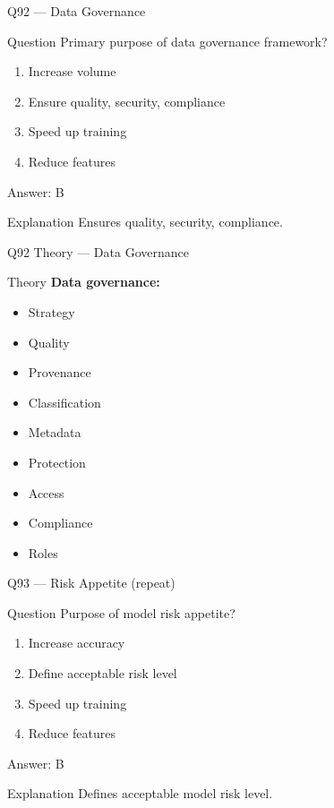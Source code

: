 \documentclass[aspectratio=169,8pt]{beamer}
\begin{document}
	\begin{frame}{Q92 --- Data Governance}
		\begin{block}{Question}
			Primary purpose of data governance framework?
		\end{block}
		\begin{enumerate}[label=\Alph*.]
			\item Increase volume
			\item Ensure quality, security, compliance
			\item Speed up training
			\item Reduce features
		\end{enumerate}
		\begin{exampleblock}{Answer: B}
		\end{exampleblock}
		\begin{block}{Explanation}
			Ensures quality, security, compliance.
		\end{block}
	\end{frame}
	
	\begin{frame}{Q92 Theory --- Data Governance}
		\begin{block}{Theory}
			\textbf{Data governance:}
			\begin{itemize}
				\item Strategy
				\item Quality
				\item Provenance
				\item Classification
				\item Metadata
				\item Protection
				\item Access
				\item Compliance
				\item Roles
			\end{itemize}
		\end{block}
	\end{frame}
	
	\begin{frame}{Q93 --- Risk Appetite (repeat)}
		\begin{block}{Question}
			Purpose of model risk appetite?
		\end{block}
		\begin{enumerate}[label=\Alph*.]
			\item Increase accuracy
			\item Define acceptable risk level
			\item Speed up training
			\item Reduce features
		\end{enumerate}
		\begin{exampleblock}{Answer: B}
		\end{exampleblock}
		\begin{block}{Explanation}
			Defines acceptable model risk level.
		\end{block}
	\end{frame}
	
\end{document}
